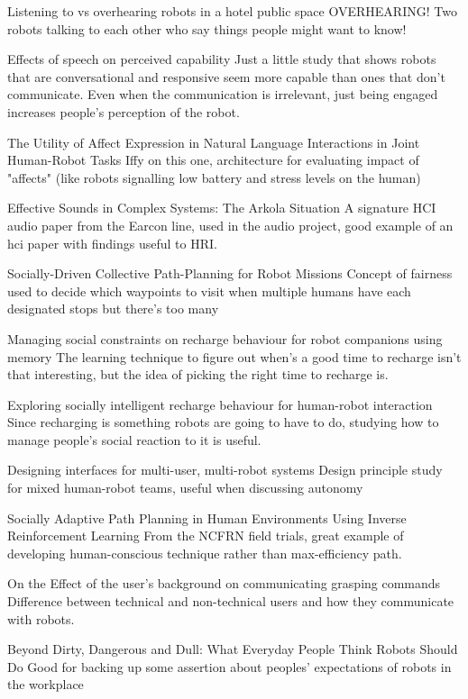 \documentclass{sfuthesis}
\begin{document}
Listening to vs overhearing robots in a hotel public space	OVERHEARING! Two robots talking to each other who say things people might want to know!	

Effects of speech on perceived capability	Just a little study that shows robots that are conversational and responsive seem more capable than ones that don't communicate. Even when the communication is irrelevant, just being engaged increases people's perception of the robot.	

The Utility of Affect Expression in Natural Language Interactions in Joint Human-Robot Tasks	Iffy on this one, architecture for evaluating impact of "affects" (like robots signalling low battery and stress levels on the human)	

Effective Sounds in Complex Systems: The Arkola Situation   A signature HCI audio paper from the Earcon line, used in the audio project, good example of an hci paper with findings useful to HRI.

Socially-Driven Collective Path-Planning for Robot Missions	Concept of fairness used to decide which waypoints to visit when multiple humans have each designated stops but there's too many

Managing social constraints on recharge behaviour for robot companions using memory	The learning technique to figure out when's a good time to recharge isn't that interesting, but the idea of picking the right time to recharge is.

Exploring socially intelligent recharge behaviour for human-robot interaction	Since recharging is something robots are going to have to do, studying how to manage people's social reaction to it is useful.

Designing interfaces for multi-user, multi-robot systems	Design principle study for mixed human-robot teams, useful when discussing autonomy	

Socially Adaptive Path Planning in Human Environments Using Inverse Reinforcement Learning	From the NCFRN field trials, great example of developing human-conscious technique rather than max-efficiency path.	

On the Effect of the user's background on communicating grasping commands	Difference between technical and non-technical users and how they communicate with robots.	

Beyond Dirty, Dangerous and Dull: What Everyday People Think Robots Should Do	Good for backing up some assertion about peoples' expectations of robots in the workplace	
\end{document}
